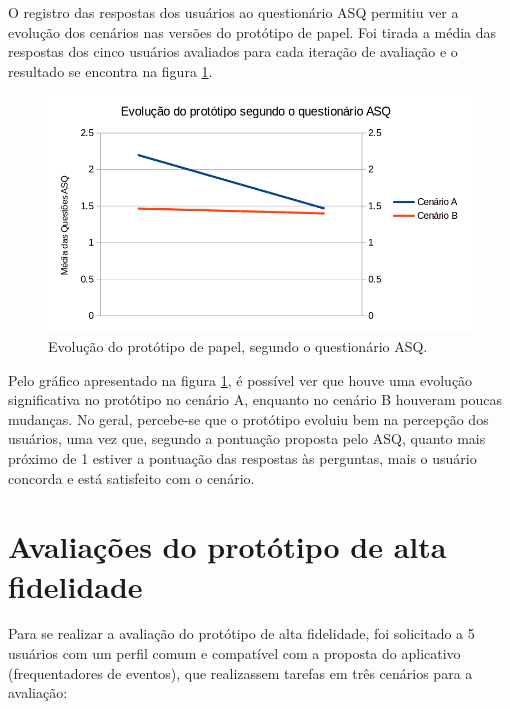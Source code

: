       O registro das respostas dos usuários ao questionário ASQ permitiu ver a evolução dos cenários nas versões do 
      protótipo de papel. Foi tirada a média das respostas dos cinco usuários avaliados para cada iteração de avaliação
      e o resultado se encontra na figura \ref{evolucao_prototipo_papel_ASQ}.
      
      
      \begin{figure}[!htpb]
	\centering
	\includegraphics[scale=0.35]{editaveis/figuras/evolucao_prototipo_papel_ASQ}
	\caption[Evolução do protótipo de papel, segundo o questionário ASQ]
	  {Evolução do protótipo de papel, segundo o questionário ASQ.}
	\label{evolucao_prototipo_papel_ASQ}
      \end{figure}
      
      Pelo gráfico apresentado na figura \ref{evolucao_prototipo_papel_ASQ}, é possível ver que houve uma evolução significativa
      no protótipo no cenário A, enquanto no cenário B houveram poucas mudanças. No geral, percebe-se que o protótipo evoluiu
      bem na percepção dos usuários, uma vez que, segundo a pontuação proposta pelo ASQ, quanto mais próximo de 1 estiver
      a pontuação das respostas às perguntas, mais o usuário concorda e está satisfeito com o cenário.
  
  \vfill
  \pagebreak
  \section{Avaliações do protótipo de alta fidelidade}
    
      Para se realizar a avaliação do protótipo de alta fidelidade, foi solicitado a 5 usuários com um perfil comum
      e compatível com a proposta do aplicativo (frequentadores de eventos), que realizassem tarefas em 
      três cenários para a avaliação:
    
